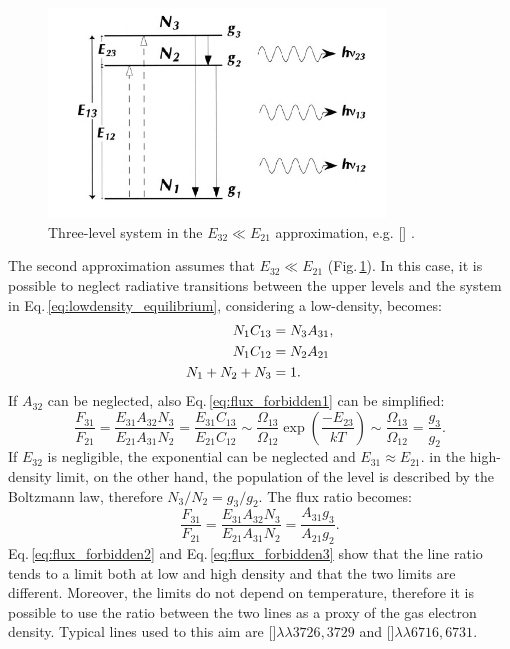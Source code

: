 \documentclass[../main.tex]{subfiles}
\begin{document}
\begin{figure}
\centering
\includegraphics[width=0.8\textwidth]{images/s2_scheme.png} 
\caption[]{Three-level system in the $E_{32}\ll E_{21}$ approximation, e.g. [] \citep{Dopita03}.  }
\label{fig:s2_scheme}
\end{figure}

The second approximation assumes that $E_{32}\ll E_{21}$ (Fig.\,\ref{fig:s2_scheme}).
In this case, it is possible to neglect radiative transitions between the upper levels and the system in Eq.\,\ref{eq:lowdensity_equilibrium}, considering a low-density, becomes:
\begin{align}
    \label{eq:lowdensity_equilibrium1}
    N_1 C_{13} &= N_3A_{31}, \notag\\
    N_1 C_{12} &= N_2A_{21}\\
    N_1+N_2+N_3 &= 1. \notag
\end{align}
If $A_{32}$ can be neglected, also Eq.\,\ref{eq:flux_forbidden1} can be simplified:
\begin{equation}
    \label{eq:flux_forbidden2}
    \frac{F_{31}}{F_{21}} = \frac{E_{31}A_{32}N_3}{E_{21}A_{31}N_2} = \frac{E_{31}C_{13}}{E_{21}C_{12}}\sim\frac{\Omega_{13}}{\Omega_{12}}\exp \left(\frac{-E_{23}}{kT}\right)\sim\frac{\Omega_{13}}{\Omega_{12}} = \frac{g_3}{g_2}.
\end{equation}
If $E_{32}$ is negligible, the exponential can be neglected and $E_{31}\approx E_{21}$.
in the high-density limit, on the other hand, the population of the level is described by the Boltzmann law, therefore $N_3/N_2 = g_3/g_2$.
The flux ratio becomes:
\begin{equation}
    \label{eq:flux_forbidden3}
    \frac{F_{31}}{F_{21}} = \frac{E_{31}A_{32}N_3}{E_{21}A_{31}N_2} = \frac{A_{31}g_3}{A_{21}g_2}.
\end{equation}
Eq.\,\ref{eq:flux_forbidden2} and Eq.\,\ref{eq:flux_forbidden3} show that the line ratio tends to a limit both at low and high density and that the two limits are different.
Moreover, the limits do not depend on temperature, therefore it is possible to use the ratio between the two lines as a proxy of the gas electron density.
Typical lines used to this aim are []$\lambda\lambda3726,3729$ and []$\lambda\lambda6716,6731$.
\end{document}
